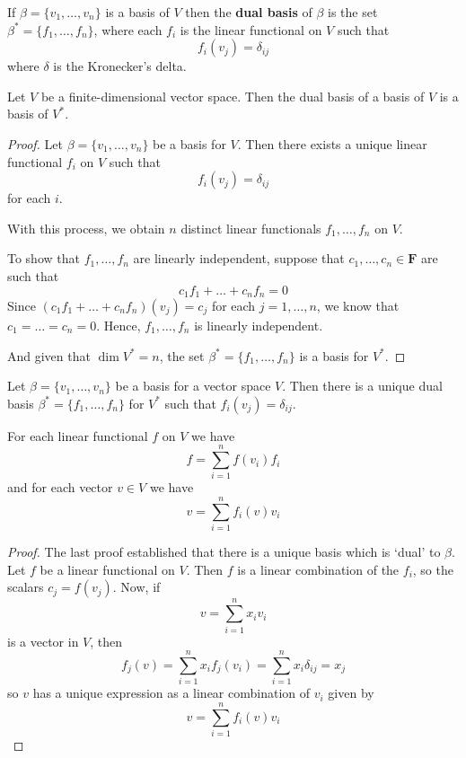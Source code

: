 \begin{definition}
	If $\beta = \{ v_1, \ldots, v_n \}$ is a basis of $V$ then the \textbf{dual basis} of $\beta$ is the set $\beta^\ast = \{ f_1, \ldots, f_n \}$, where each $f_i$ is the linear functional on $V$ such that 
	\[
		f_i(v_j) = \delta_{ij}
	\]
	where $\delta$ is the Kronecker's delta.
\end{definition}

\begin{theorem}
	Let $V$ be a finite-dimensional vector space. Then the dual basis of a basis of $V$ is a basis of $V^\ast$.
\end{theorem}

\begin{proof}
	Let $\beta = \{ v_1, \ldots, v_n \}$ be a basis for $V$. Then there exists a unique linear functional $f_i$ on $V$ such that
	\[
		f_i(v_j) = \delta_{ij}
	\]
	for each $i$.

	With this process, we obtain $n$ distinct linear functionals $f_1, \ldots, f_n$ on $V$.

	To show that $f_1, \ldots, f_n$ are linearly independent, suppose that $c_1, \ldots, c_n \in \textbf{F}$ are such that
	\[
		c_1 f_1 + \ldots + c_n f_n = 0
	\]
	Since $(c_1 f_1 + \ldots + c_n f_n)(v_j) = c_j$ for each $j = 1, \ldots, n$, we know that $c_1 = \ldots = c_n = 0$. Hence, $f_1, \ldots, f_n$ is linearly independent.
	
	And given that $\dim V^\ast = n$, the set $\beta^\ast = \{ f_1, \ldots, f_n \}$ is a basis for $V^\ast$.
\end{proof}

\begin{theorem}
	Let $\beta = \{ v_1, \ldots, v_n \}$ be a basis for a vector space $V$. Then there is a unique dual basis $\beta^\ast = \{ f_1, \ldots, f_n \}$ for $V^\ast$ such that $f_i (v_j) = \delta_{ij}$.
	
	For each linear functional $f$ on $V$ we have
	\[
		f = \sum_{i=1}^n f(v_i) f_i
	\]
	and for each vector $v \in V$ we have
	\[
		v = \sum_{i=1}^n f_i(v) v_i
	\]
\end{theorem}

\begin{proof}
	The last proof established that there is a unique basis which is `dual' to $\beta$. Let $f$ be a linear functional on $V$. Then $f$ is a linear combination of the $f_i$, so the scalars $c_j = f(v_j)$. Now, if
	\[
		v = \sum_{i=1}^n x_i v_i
	\]
	is a vector in $V$, then
	\[
		f_j(v) = \sum_{i=1}^n x_i f_j(v_i) = \sum_{i=1}^n x_i \delta_{ij} = x_j
	\]
	so $v$ has a unique expression as a linear combination of $v_i$ given by
	\[
		v = \sum_{i=1}^n f_i(v) v_i
	\]
\end{proof}

